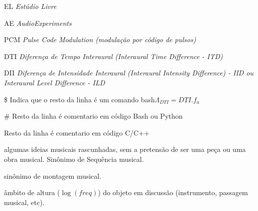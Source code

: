 \begin{listaespecial}[BIGNAMEWIDTH]
		\item[EL] \emph{Estúdio Livre}
		\item[AE] \emph{AudioExperiments}
		\item[PCM] \emph{Pulse Code Modulation (modulação por código de pulsos)}
		\item[DTI] \emph{Diferença de Tempo Interaural (\emph{Interaural Time Difference} - ITD)}
		\item[DII] \emph{Diferença de Intensidade Interaural (\emph{Interaural Intensity Difference)} - IID ou \emph{Interaural Level Difference} - ILD}
	\end{listaespecial} 

	\begin{listaespecial}[BIGNAMEWIDTH]
		\item[\$] Indica que o resto da linha é um comando bash$\Lambda_{DTI}=DTI . f_a$
		\item[\#] Resto da linha é comentario em código Bash ou Python
		\item[] Resto da linha é comentario em código C/C++
	\end{listaespecial} 

	\begin{listaespecial2}[BIGNAMEWIDTH]
		\item[Montagem musical :] algumas ideias musicais rascunhadas, sem a pretensão de ser uma peça ou uma obra musical. Sinônimo de Sequência musical.
		\item[Sequência musical :] sinônimo de montagem musical. 
		\item[Tessitura :] âmbito de altura ($\log(freq)$) do objeto em discussão (instrumento, passagem musical, etc).
	\end{listaespecial2} 


\sumario

